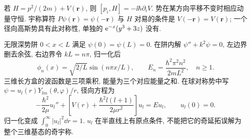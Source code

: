 若 $H=p^2/(2m)+V(\mathbf r)$, 则 $[p_i,H]=-\ii\hbar\partial_iV$. 势在某方向平移不变时相应动量守恒. 宇称算符 $P\psi(\mathbf r)=\psi(-\mathbf r)$ 与 $H$ 对易的条件是 $V(-\mathbf r)=V(\mathbf r)$; 一个径向高斯势具有此对称性, 单独的 $\mathrm e^{-x}(y^3+3z)$ 没有.

无限深势阱 $0<x<L$ 满足 $\psi(0)=\psi(L)=0$. 在阱内解 $\psi''+k^2\psi=0$, 左边界删去余弦, 右边界令 $kL=n\pi$, 归一化后
\begin{equation}
 \phi_n(x)=\sqrt{2/L}\sin(n\pi x/L),\qquad E_n=\frac{\hbar^2\pi^2n^2}{2mL^2},\quad n\ge1.
\end{equation}
三维长方盒的波函数是三项乘积, 能量为三个对应能量之和. 在球对称势中写 $\psi=u_l(r)Y_{lm}(\theta,\varphi)/r$, 径向方程为
\begin{equation}\label{eq:radial}
 -\frac{\hbar^2}{2\mu}u_l''+\left[V(r)+\frac{\hbar^2l(l+1)}{2\mu r^2}\right]u_l=Eu_l,\qquad u_l(0)=0.
\end{equation}
归一化变成 $\int_0^\infty|u_l|^2\dd r=1$. $u_l$ 在半直线上有原点条件, 不能把它的奇延拓误解为整个三维基态的奇宇称.
